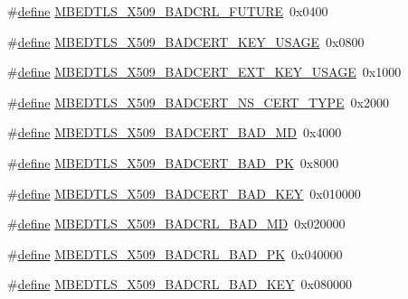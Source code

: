 \begin{DoxyCompactItemize}
\item 
\#\hyperlink{structdefine}{define} \hyperlink{group__x509__module_gad93c0f614969729f7d13fb0a3acac68e}{M\+B\+E\+D\+T\+L\+S\+\_\+\+X509\+\_\+\+B\+A\+D\+C\+R\+L\+\_\+\+F\+U\+T\+U\+RE}~0x0400
\item 
\#\hyperlink{structdefine}{define} \hyperlink{group__x509__module_ga28705c8c3091a013487df25842249c0f}{M\+B\+E\+D\+T\+L\+S\+\_\+\+X509\+\_\+\+B\+A\+D\+C\+E\+R\+T\+\_\+\+K\+E\+Y\+\_\+\+U\+S\+A\+GE}~0x0800
\item 
\#\hyperlink{structdefine}{define} \hyperlink{group__x509__module_gac3dab3183efdbca7e988916e7fc1a02a}{M\+B\+E\+D\+T\+L\+S\+\_\+\+X509\+\_\+\+B\+A\+D\+C\+E\+R\+T\+\_\+\+E\+X\+T\+\_\+\+K\+E\+Y\+\_\+\+U\+S\+A\+GE}~0x1000
\item 
\#\hyperlink{structdefine}{define} \hyperlink{group__x509__module_gaa383ae441177fa7a16fb2313bb48bb10}{M\+B\+E\+D\+T\+L\+S\+\_\+\+X509\+\_\+\+B\+A\+D\+C\+E\+R\+T\+\_\+\+N\+S\+\_\+\+C\+E\+R\+T\+\_\+\+T\+Y\+PE}~0x2000
\item 
\#\hyperlink{structdefine}{define} \hyperlink{group__x509__module_ga41b54b526c11bf51cc431ef1a151816d}{M\+B\+E\+D\+T\+L\+S\+\_\+\+X509\+\_\+\+B\+A\+D\+C\+E\+R\+T\+\_\+\+B\+A\+D\+\_\+\+MD}~0x4000
\item 
\#\hyperlink{structdefine}{define} \hyperlink{group__x509__module_ga9332fa1e09a373cc56234525b14546c4}{M\+B\+E\+D\+T\+L\+S\+\_\+\+X509\+\_\+\+B\+A\+D\+C\+E\+R\+T\+\_\+\+B\+A\+D\+\_\+\+PK}~0x8000
\item 
\#\hyperlink{structdefine}{define} \hyperlink{group__x509__module_gaef5f9a34b327eb79750ebc3779e98282}{M\+B\+E\+D\+T\+L\+S\+\_\+\+X509\+\_\+\+B\+A\+D\+C\+E\+R\+T\+\_\+\+B\+A\+D\+\_\+\+K\+EY}~0x010000
\item 
\#\hyperlink{structdefine}{define} \hyperlink{group__x509__module_gad3f810fb74f94164185b88b90fffa329}{M\+B\+E\+D\+T\+L\+S\+\_\+\+X509\+\_\+\+B\+A\+D\+C\+R\+L\+\_\+\+B\+A\+D\+\_\+\+MD}~0x020000
\item 
\#\hyperlink{structdefine}{define} \hyperlink{group__x509__module_ga182a6f1f465e566de7586e6ee8fa7c4e}{M\+B\+E\+D\+T\+L\+S\+\_\+\+X509\+\_\+\+B\+A\+D\+C\+R\+L\+\_\+\+B\+A\+D\+\_\+\+PK}~0x040000
\item 
\#\hyperlink{structdefine}{define} \hyperlink{group__x509__module_gac2947ead6fd1035296826110ca74a364}{M\+B\+E\+D\+T\+L\+S\+\_\+\+X509\+\_\+\+B\+A\+D\+C\+R\+L\+\_\+\+B\+A\+D\+\_\+\+K\+EY}~0x080000
\end{DoxyCompactItemize}
